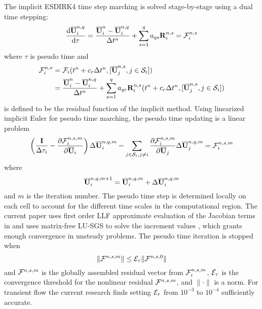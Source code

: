 The implicit ESDIRK4 time step marching is solved stage-by-stage
using a dual time stepping:
\begin{equation}
    \derivative{\uu^{n,q}_i}{\tau} = \frac{\uu^{n}_i - \uu^{n,q}_i}{\inc t^n} + \sum_{s=1}^q a_{qs} \R^{n,s}_i = \FF_i^{n,s}
\end{equation}
where $\tau$ is pseudo time and
\begin{equation}
    \begin{aligned}
        \mathcal{F}_i^{n,s}
         & =
        \mathcal{F}_i(t^n + c_r\mathrm\Delta t^n, [\overline{\mathbf{U}}_j^{n,s}, j\in\mathcal{S}_i] ) \\
         & =
        \frac{\overline{\mathbf{U}}^{n}_i - \overline{\mathbf{U}}^{n,q}_i}{\mathrm\Delta t^n} +
        \sum_{s=1}^q a_{qr} \mathbf{R}^{n,s}_i( t^n + c_r\mathrm\Delta t^n, [\overline{\mathbf{U}}_j^{n,s}, j\in\mathcal{S}_i] )
    \end{aligned}
\end{equation}
is defined to be the residual function of the implicit method.
Using linearized implicit Euler for pseudo time marching,
the pseudo time updating is a linear problem
\begin{equation}
    \left(\frac{\eye}{\inc \tau_i}-\partialderivative{\FF_i^{n,s,m} }{\uu_i} \right) \inc \uu^{n,q, m}_i
    -
    \sum_{j\in\SAll_i,j\neq i} {
        \partialderivative{\FF_i^{n,s,m} }{\uu_j} \inc \uu^{n,q, m}_j
    }
    = \FF_i^{n,s,m}
    \label{eq:linearTauUpdate}
\end{equation}
where
\begin{equation}
    \overline{\mathbf{U}}^{n,q, m + 1}_i = \overline{\mathbf{U}}^{n,q, m}_i + \mathrm\Delta \overline{\mathbf{U}}^{n,q, m}_i
\end{equation}
and $m$ is the iteration number.
The pseudo time step is determined locally on each cell to account for
the different time scales in the computational region.
The current paper uses first order LLF approximate evaluation
of the Jacobian terms in  and uses matrix-free
LU-SGS to solve the increment values \cite{luo1998fast,luo2001accurate},
which grants enough convergence in unsteady problems. 
The pseudo time iteration is stopped when
\begin{equation}
    \|\FF^{n,s,m}\| \leq \varE_{\tau} \|\FF^{n,s,0}\|
\end{equation}
and $\mathcal{F}^{n,s,m}$ is the globally assembled residual vector from 
$\mathcal{F}^{n,s,m}_i$, $\varE_{\tau}$ is the convergence threshold for
the nonlinear residual $\mathcal{F}^{n,s,m}$, and $\|\cdot\|$ is 
a norm. For transient flow the current research finds setting $\varE_{\tau}$
from $10^{-3}$ to $10^{-4}$ sufficiently accurate.





